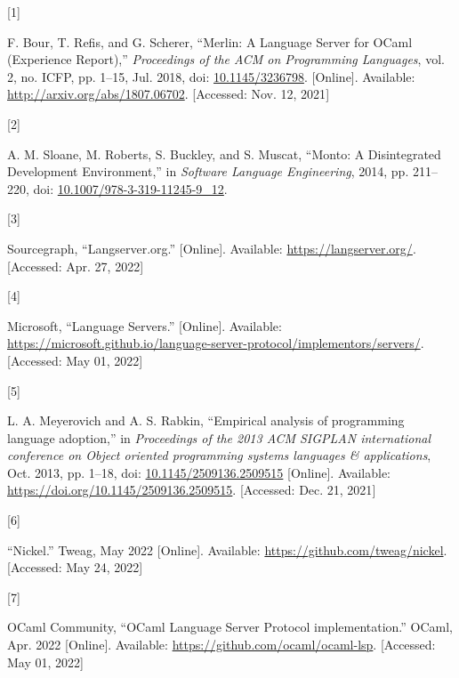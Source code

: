 \documentclass[
  a4paper,
  bibtex,
  english,
  nomenclature]{kthlatex/kththesis/kththesis}
\newlength{\cslhangindent}
\newlength{\csllabelwidth}
\newlength{\cslentryspacingunit} %
\newenvironment{CSLReferences}[2] %
 {%
  \setlength{\parindent}{0pt}
  \ifodd #1
  \let\oldpar\par
  \def\par{\hangindent=\cslhangindent\oldpar}
  \fi
  \setlength{\parskip}{#2\cslentryspacingunit}
 }%
 {}
\newcommand{\CSLLeftMargin}[1]{\parbox[t]{\csllabelwidth}{#1}}
\newcommand{\CSLRightInline}[1]{\parbox[t]{\linewidth - \csllabelwidth}{#1}\break}
\begin{document}
\hypertarget{refs}{}
\begin{CSLReferences}{0}{0}
\leavevmode{}%
\CSLLeftMargin{{[}1{]} }
\CSLRightInline{F. Bour, T. Refis, and G. Scherer, {``Merlin: {A
Language Server} for {OCaml} ({Experience Report}),''} \emph{Proceedings
of the ACM on Programming Languages}, vol. 2, no. ICFP, pp. 1--15, Jul.
2018, doi: \href{https://doi.org/10.1145/3236798}{10.1145/3236798}.
{[}Online{]}. Available: \url{http://arxiv.org/abs/1807.06702}.
{[}Accessed: Nov. 12, 2021{]}}

\leavevmode{}%
\CSLLeftMargin{{[}2{]} }
\CSLRightInline{A. M. Sloane, M. Roberts, S. Buckley, and S. Muscat,
{``Monto: {A Disintegrated Development Environment},''} in
\emph{Software {Language Engineering}}, 2014, pp. 211--220, doi:
\href{https://doi.org/10.1007/978-3-319-11245-9_12}{10.1007/978-3-319-11245-9\_12}.
}

\leavevmode{}%
\CSLLeftMargin{{[}3{]} }
\CSLRightInline{Sourcegraph, {``Langserver.org.''} {[}Online{]}.
Available: \url{https://langserver.org/}. {[}Accessed: Apr. 27, 2022{]}}

\leavevmode{}%
\CSLLeftMargin{{[}4{]} }
\CSLRightInline{Microsoft, {``Language {Servers}.''} {[}Online{]}.
Available:
\url{https://microsoft.github.io/language-server-protocol/implementors/servers/}.
{[}Accessed: May 01, 2022{]}}

\leavevmode{}%
\CSLLeftMargin{{[}5{]} }
\CSLRightInline{L. A. Meyerovich and A. S. Rabkin, {``Empirical analysis
of programming language adoption,''} in \emph{Proceedings of the 2013
{ACM SIGPLAN} international conference on {Object} oriented programming
systems languages \& applications}, Oct. 2013, pp. 1--18, doi:
\href{https://doi.org/10.1145/2509136.2509515}{10.1145/2509136.2509515}
{[}Online{]}. Available: \url{https://doi.org/10.1145/2509136.2509515}.
{[}Accessed: Dec. 21, 2021{]}}

\leavevmode{}%
\CSLLeftMargin{{[}6{]} }
\CSLRightInline{{``Nickel.''} Tweag, May 2022 {[}Online{]}. Available:
\url{https://github.com/tweag/nickel}. {[}Accessed: May 24, 2022{]}}

\leavevmode{}%
\CSLLeftMargin{{[}7{]} }
\CSLRightInline{OCaml Community, {``{OCaml Language Server Protocol}
implementation.''} OCaml, Apr. 2022 {[}Online{]}. Available:
\url{https://github.com/ocaml/ocaml-lsp}. {[}Accessed: May 01, 2022{]}}


\end{CSLReferences}
\end{document}

